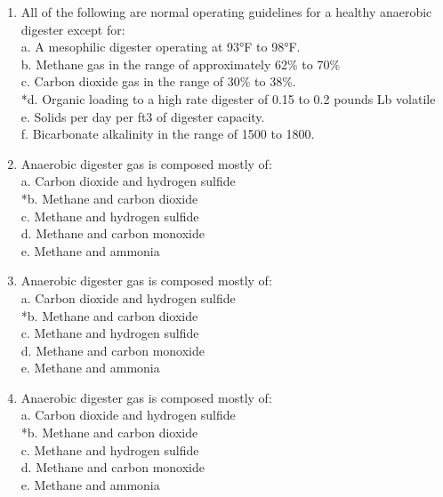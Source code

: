 \documentclass{article}
\begin{document}
\begin{enumerate}
\item  All of the following are normal operating guidelines for a healthy anaerobic digester except for: \\

a. A mesophilic digester operating at 93°F to 98°F. \\
b. Methane gas in the range of approximately 62\% to 70\% \\
c. Carbon dioxide gas in the range of 30\% to 38\%. \\
*d. Organic loading to a high rate digester of 0.15 to 0.2 pounds Lb volatile \\
e. Solids per day per ft3 of digester capacity. \\
f. Bicarbonate alkalinity in the range of 1500 to 1800. \\

\item  Anaerobic digester gas is composed mostly of: \\

a. Carbon dioxide and hydrogen sulfide \\
*b. Methane and carbon dioxide \\
c. Methane and hydrogen sulfide \\
d. Methane and carbon monoxide \\
e. Methane and ammonia \\

\item  Anaerobic digester gas is composed mostly of: \\

a. Carbon dioxide and hydrogen sulfide \\
*b. Methane and carbon dioxide \\
c. Methane and hydrogen sulfide \\
d. Methane and carbon monoxide \\
e. Methane and ammonia \\

\item  Anaerobic digester gas is composed mostly of: \\

a. Carbon dioxide and hydrogen sulfide \\
*b. Methane and carbon dioxide \\
c. Methane and hydrogen sulfide \\
d. Methane and carbon monoxide \\
e. Methane and ammonia \\


\end{enumerate}
\end{document}
